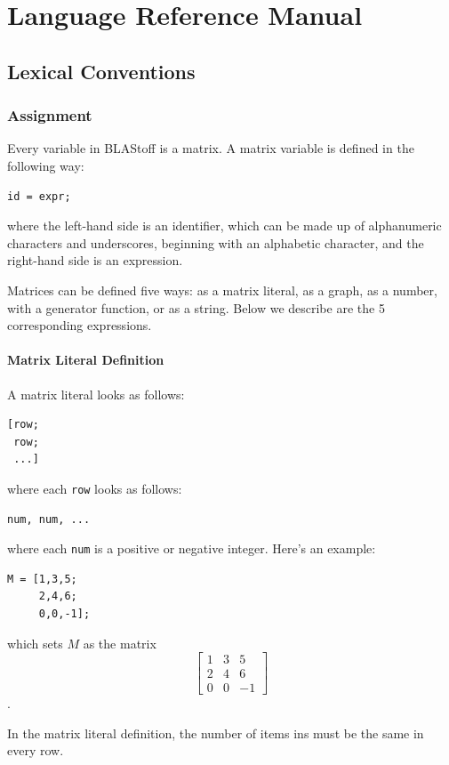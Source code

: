 \section{Language Reference Manual}
\subsection{Lexical Conventions}

\subsubsection{Assignment}
Every variable in BLAStoff is a matrix.  A matrix variable is defined in the following way:
\begin{lstlisting}
id = expr;
\end{lstlisting}
where the left-hand side is an identifier, which can be made up of alphanumeric characters and underscores, beginning with an alphabetic character, and the right-hand side is an expression.

Matrices can be defined five ways: as a matrix literal, as a graph, as a number, with a generator function, or as a string.  Below we describe are the 5 corresponding expressions.
\paragraph{Matrix Literal Definition}
A matrix literal looks as follows:

\begin{lstlisting}
[row;
 row;
 ...]
\end{lstlisting}
where each \verb=row= looks as follows:
\begin{lstlisting}
num, num, ...
\end{lstlisting}
where each \verb=num= is a positive or negative integer.  Here's an example:
\begin{lstlisting}
M = [1,3,5;
     2,4,6;
     0,0,-1];
\end{lstlisting}
which sets $M$ as the matrix $$\begin{bmatrix}1&3&5\\2&4&6\\0&0&-1\end{bmatrix}$$.

In the matrix literal definition, the number of items ins must be the same in every row.
